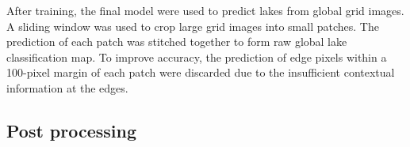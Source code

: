 \documentclass[preprint,12pt,authoryear]{elsarticle}
\begin{document}
After training, the final model were used to predict lakes from global grid images. A sliding window was used to crop large grid images into small patches. The prediction of each patch was stitched together to form raw global lake classification map. To improve accuracy, the prediction of edge pixels within a 100-pixel margin of each patch were discarded due to the insufficient contextual information at the edges. 

\subsection{Post processing}
\label{subsec4}
\end{document}
